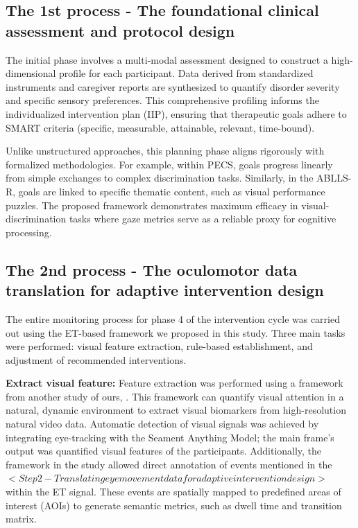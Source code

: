 \subsection{The 1st process - The foundational clinical assessment and protocol design}

The initial phase involves a multi-modal assessment designed to construct a high-dimensional profile for each participant. Data derived from standardized instruments and caregiver reports are synthesized to quantify disorder severity and specific sensory preferences. This comprehensive profiling informs the individualized intervention plan (IIP), ensuring that therapeutic goals adhere to SMART criteria (specific, measurable, attainable, relevant, time-bound).

Unlike unstructured approaches, this planning phase aligns rigorously with formalized methodologies. For example, within PECS, goals progress linearly from simple exchanges to complex discrimination tasks. Similarly, in the ABLLS-R, goals are linked to specific thematic content, such as visual performance puzzles. The proposed framework demonstrates maximum efficacy in visual-discrimination tasks where gaze metrics serve as a reliable proxy for cognitive processing.

\subsection{The 2nd process - The oculomotor data translation for adaptive intervention design}

The entire monitoring process for phase 4 of the intervention cycle was carried out using the ET-based framework we proposed in this study. Three main tasks were performed: visual feature extraction, rule-based establishment, and adjustment of recommended interventions.

\textbf{Extract visual feature:}  Feature extraction was performed using a framework from another study of ours, \cite{newETSAM}. This framework can quantify visual attention in a natural, dynamic environment to extract visual biomarkers from high-resolution natural video data. Automatic detection of visual signals was achieved by integrating eye-tracking with the Seament Anything Model; the main frame's output was quantified visual features of the participants. Additionally, the framework in the \cite{newETSAM} study allowed direct annotation of events mentioned in the $<Step 2 - Translating eye movement data for adaptive intervention design>$ within the ET signal. These events are spatially mapped to predefined areas of interest (AOIs) to generate semantic metrics, such as dwell time and transition matrix. 


